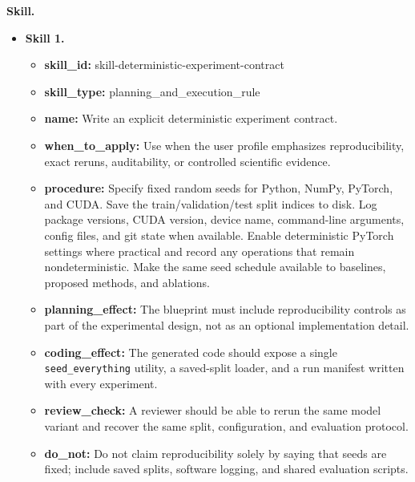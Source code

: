 \documentclass{opendatalab}
\begin{document}
\begin{tcolorbox}
\textbf{Skill.}
\begin{itemize}\setlength\itemsep{2pt}
  \item \textbf{Skill 1.}
  \begin{itemize}\setlength\itemsep{1pt}
    \item \textbf{skill\_id:} skill-deterministic-experiment-contract
    \item \textbf{skill\_type:} planning\_and\_execution\_rule
    \item \textbf{name:} Write an explicit deterministic experiment contract.
    \item \textbf{when\_to\_apply:} Use when the user profile emphasizes reproducibility, exact reruns, auditability, or controlled scientific evidence.
    \item \textbf{procedure:} Specify fixed random seeds for Python, NumPy, PyTorch, and CUDA. Save the train/validation/test split indices to disk. Log package versions, CUDA version, device name, command-line arguments, config files, and git state when available. Enable deterministic PyTorch settings where practical and record any operations that remain nondeterministic. Make the same seed schedule available to baselines, proposed methods, and ablations.
    \item \textbf{planning\_effect:} The blueprint must include reproducibility controls as part of the experimental design, not as an optional implementation detail.
    \item \textbf{coding\_effect:} The generated code should expose a single \texttt{seed\_everything} utility, a saved-split loader, and a run manifest written with every experiment.
    \item \textbf{review\_check:} A reviewer should be able to rerun the same model variant and recover the same split, configuration, and evaluation protocol.
    \item \textbf{do\_not:} Do not claim reproducibility solely by saying that seeds are fixed; include saved splits, software logging, and shared evaluation scripts.
  \end{itemize}


\end{itemize}
\end{tcolorbox}
\end{document}
